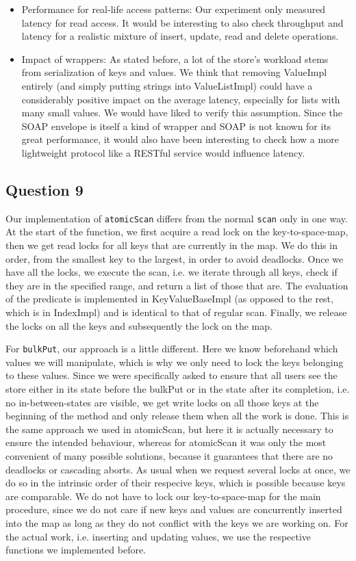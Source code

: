 \documentclass[12pt,a4paper]{article}
\begin{document}
\begin{itemize}
  \item Performance for real-life access patterns: Our experiment only measured latency for read access. It would be interesting to also check throughput and latency for a realistic mixture of insert, update, read and delete operations.
  \item Impact of wrappers: As stated before, a lot of the store's workload stems from serialization of keys and values. We think that removing ValueImpl entirely (and simply putting strings into ValueListImpl) could have a considerably positive impact on the average latency, especially for lists with many small values. We would have liked to verify this assumption. Since the SOAP envelope is itself a kind of wrapper and SOAP is not known for its great performance, it would also have been interesting to check how a more lightweight protocol like a RESTful service would influence latency.
  
\end{itemize}

\subsection*{Question 9}
\label{sec:pq9}
Our implementation of \texttt{atomicScan} differs from the normal \texttt{scan} only in one way. At the start of the function, we first acquire a read lock on the key-to-space-map, then we get read locks for all keys that are currently in the map. We do this in order, from the smallest key to the largest, in order to avoid deadlocks. Once we have all the locks, we execute the scan, i.e. we iterate through all keys, check if they are in the specified range, and return a list of those that are. The evaluation of the predicate is implemented in KeyValueBaseImpl (as opposed to the rest, which is in IndexImpl) and is identical to that of regular scan. Finally, we release the locks on all the keys and subsequently the lock on the map.

For \texttt{bulkPut}, our approach is a little different. Here we know beforehand which values we will manipulate, which is why we only need to lock the keys belonging to these values. Since we were specifically asked to ensure that all users see the store either in its state before the bulkPut or in the state after its completion, i.e. no in-between-states are visible, we get write locks on all those keys at the beginning of the method and only release them when all the work is done. This is the same approach we used in atomicScan, but here it is actually necessary to ensure the intended behaviour, whereas for atomicScan it was only the most convenient of many possible solutions, because it guarantees that there are no deadlocks or cascading aborts. As usual when we request several locks at once, we do so in the intrinsic order of their respecive keys, which is possible because keys are comparable. We do not have to lock our key-to-space-map for the main procedure, since we do not care if new keys and values are concurrently inserted into the map as long as they do not conflict with the keys we are working on. For the actual work, i.e. inserting and updating values, we use the respective functions we implemented before.
 
\end{document}
